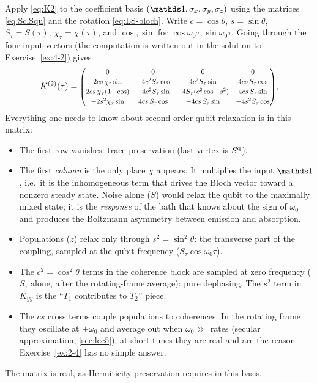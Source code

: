 \begin{exbox}
Apply \cref{eq:K2} to the coefficient basis $(\Id,\sx,\sy,\sz)$ using the matrices \eqref{eq:SclSqu} and the rotation \eqref{eq:LS-bloch}.
Write $c=\cos\theta$, $s=\sin\theta$, $S_\tau=S(\tau)$, $\chi_\tau=\chi(\tau)$, and $\cos,\sin$ for $\cos\omega_0\tau,\sin\omega_0\tau$.
Going through the four input vectors (the computation is written out in the solution to Exercise~\ref{ex:4-2}) gives
\begin{equation}
  K^{(2)}(\tau)=\scalebox{0.82}{$\displaystyle
  \begin{pmatrix}
  0 & 0 & 0 & 0\\[2pt]
  2cs\,\chi_\tau\sin & -4c^2S_\tau\cos & 4c^2S_\tau\sin & 4cs\,S_\tau\cos\\[2pt]
  2cs\,\chi_\tau(1\!-\!\cos) & -4c^2S_\tau\sin & -4S_\tau(c^2\cos+s^2) & 4cs\,S_\tau\sin\\[2pt]
  -2s^2\chi_\tau\sin & 4cs\,S_\tau\cos & -4cs\,S_\tau\sin & -4s^2S_\tau\cos
  \end{pmatrix}$},
  \label{eq:K2-bloch}
\end{equation}
Everything one needs to know about second-order qubit relaxation is in this matrix:
\begin{itemize}[itemsep=1pt]
\item The first row vanishes: trace preservation (last vertex is $S^{\mathrm{q}}$).
\item The first \emph{column} is the only place $\chi$ appears.
  It multiplies the input $\Id$, i.e.\ it is the inhomogeneous term that drives the Bloch vector toward a nonzero steady state.
  Noise alone ($S$) would relax the qubit to the maximally mixed state; it is the \emph{response} of the bath that knows about the sign of $\omega_0$ and produces the Boltzmann asymmetry between emission and absorption.
\item Populations ($z$) relax only through $s^2=\sin^2\theta$: the transverse part of the coupling, sampled at the qubit frequency ($S_\tau\cos\omega_0\tau$).
\item The $c^2=\cos^2\theta$ terms in the coherence block are sampled at zero frequency ($S_\tau$ alone, after the rotating-frame average): pure dephasing.
  The $s^2$ term in $K_{yy}$ is the ``$T_1$ contributes to $T_2$'' piece.
\item The $cs$ cross terms couple populations to coherences.
  In the rotating frame they oscillate at $\pm\omega_0$ and average out when $\omega_0\gg$ rates (secular approximation, \cref{sec:lec5}); at short times they are real and are the reason Exercise~\ref{ex:2-4} has no simple answer.
\end{itemize}
The matrix is real, as Hermiticity preservation requires in this basis.
\end{exbox}

